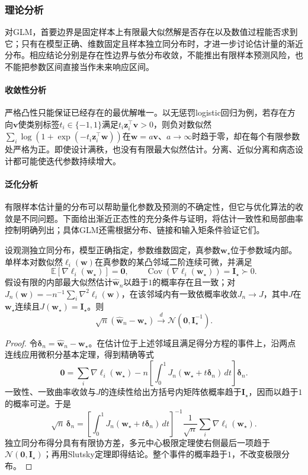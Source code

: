 \subsubsection{理论分析}
\label{sec:regression-glm-theory}

对GLM，首要边界是固定样本上有限最大似然解是否存在以及数值过程能否求到它；只有在模型正确、维数固定且样本独立同分布时，才进一步讨论估计量的渐近分布。相应结论分别是存在性边界与依分布收敛，不能推出有限样本预测风险，也不能把参数区间直接当作未来响应区间。

\paragraph{收敛性分析}
严格凸性只能保证已经存在的最优解唯一。以无惩罚logistic回归为例，若存在方向$\bm{v}$使类别标签$t_i\in\{-1,1\}$满足$t_i\bm{z}_i^{\top}\bm{v}>0$，则负对数似然$\sum_i\log(1+\exp(-t_i\bm{z}_i^{\top}\bm{w}))$在$\bm{w}=a\bm{v}$、$a\to\infty$时趋于零，却在每个有限参数处严格为正。即使设计满秩，也没有有限最大似然估计。分离、近似分离和病态设计都可能使迭代参数持续增大。

\paragraph{泛化分析}
有限样本估计量的分布可以帮助量化参数及预测的不确定性，但它与优化算法的收敛是不同问题。下面给出渐近正态性的充分条件与证明，将估计一致性和局部曲率控制明确列出；具体GLM还需根据分布、链接和输入矩条件验证它们。

\begin{theorem}[正则GLM估计的渐近正态性]
  \label{thm:regression-glm-asymptotic}
  设观测独立同分布，模型正确指定，参数维数固定，真参数$\bm{w}_{\star}$位于参数域内部。单样本对数似然$\ell_i(\bm{w})$在真参数的某凸邻域二阶连续可微，并满足
  \[
    \mathbb{E}[\nabla\ell_i(\bm{w}_{\star})]=\bm{0},\qquad
    \operatorname{Cov}(\nabla\ell_i(\bm{w}_{\star}))=\bm{I}_{\star}\succ0.
  \]
  假设有限的内部最大似然估计$\widehat{\bm{w}}_n$以趋于$1$的概率存在且一致；对$J_n(\bm{w})=-n^{-1}\sum_i\nabla^2\ell_i(\bm{w})$，在该邻域内有一致依概率收敛$J_n\to J$，其中$J$在$\bm{w}_{\star}$连续且$J(\bm{w}_{\star})=\bm{I}_{\star}$。则
  \[
    \sqrt n(\widehat{\bm{w}}_n-\bm{w}_{\star})
      \xrightarrow{d}\mathcal{N}(\bm{0},\bm{I}_{\star}^{-1}).
  \]
\end{theorem}

\begin{proof}
令$\bm{\delta}_n=\widehat{\bm{w}}_n-\bm{w}_{\star}$。在估计位于上述邻域且满足得分方程的事件上，沿两点连线应用微积分基本定理，得到精确等式
\[
  \bm{0}
  =\sum_i\nabla\ell_i(\bm{w}_{\star})
    -n\left[\int_0^1
      J_n(\bm{w}_{\star}+t\bm{\delta}_n)\,dt\right]\bm{\delta}_n.
\]
一致性、一致曲率收敛与$J$的连续性给出方括号内矩阵依概率趋于$\bm{I}_{\star}$，因而以趋于$1$的概率可逆。于是
\[
  \sqrt n\,\bm{\delta}_n
  =\left[\int_0^1J_n(\bm{w}_{\star}+t\bm{\delta}_n)\,dt\right]^{-1}
    \frac{1}{\sqrt n}\sum_i\nabla\ell_i(\bm{w}_{\star}).
\]
独立同分布得分具有有限协方差，多元中心极限定理使右侧最后一项趋于$\mathcal{N}(\bm{0},\bm{I}_{\star})$；再用Slutsky定理即得结论。整个事件的概率趋于$1$，不改变极限分布。
\end{proof}

